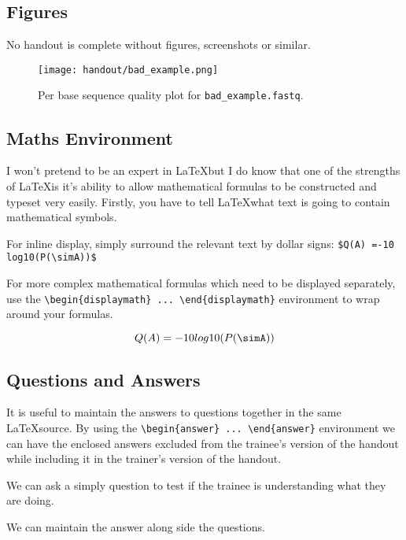 \subsection{Figures}

No handout is complete without figures, screenshots or similar.

\begin{figure}[H]
\centering
\texttt{[image: handout/bad\_example.png]}
\caption{Per base sequence quality plot for \texttt{bad\_example.fastq}.}
\label{fig:bad_example_untrimmed_plot}
\end{figure}

\subsection{Maths Environment}

I won't pretend to be an expert in \LaTeX but I do know that one of the strengths of \LaTeX is it's
ability to allow mathematical formulas to be constructed and typeset very easily. Firstly, you have
to tell \LaTeX what text is going to contain mathematical symbols.

For inline display, simply surround the relevant text by dollar signs: \verb+$Q(A) =-10 log10(P(\simA))$+

For more complex mathematical formulas which need to be displayed separately, use the
\verb+\begin{displaymath} ... \end{displaymath}+ environment to wrap around your formulas.

\begin{displaymath}
Q(A) =-10 log10(P(\simA))
\end{displaymath} 


\subsection{Questions and Answers}

It is useful to maintain the answers to questions together in the same \LaTeX source. By using the
\verb+\begin{answer} ... \end{answer}+ environment we can have the enclosed answers excluded from
the trainee's version of the handout while including it in the trainer's version of the handout.

\begin{questions}
We can ask a simply question to test if the trainee is understanding what they are doing. 
\begin{answer}
We can maintain the answer along side the questions.
\end{answer}
\end{questions}


